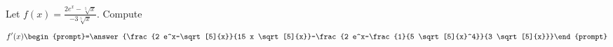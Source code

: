 \documentclass{ximera}
\author{Bart Snapp}
\begin{document}
\begin{exercise}
Let $f(x) = \frac{ 2 e^x-\sqrt[5]{x}}{-3 \sqrt[5]{x}}$. Compute
\[
f'(x)
\begin{prompt}=\answer{\frac{2 e^x-\sqrt[5]{x}}{15 x \sqrt[5]{x}}-\frac{2 e^x-\frac{1}{5 \sqrt[5]{x}^4}}{3 \sqrt[5]{x}}}\end{prompt}
\]
\end{exercise}
\end{document}
